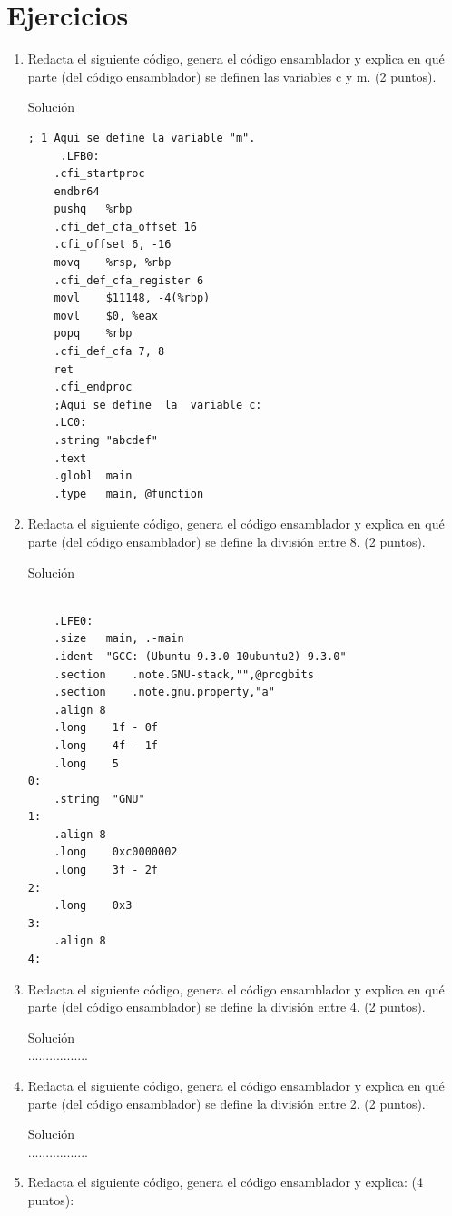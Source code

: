 \documentclass{article}
\begin{document}
	\section{Ejercicios}\label{sec:ejercicios}
	\begin{enumerate}
		\item Redacta el siguiente código, genera el código ensamblador y explica en qué parte (del código
ensamblador) se definen las variables c y m. (2 puntos).

            
		
		Solución \\
		
        
\begin{lstlisting}[language={[x86masm]Assembler}, basicstyle=\small]    
; 1 Aqui se define la variable "m".
     .LFB0:
	.cfi_startproc
	endbr64
	pushq	%rbp
	.cfi_def_cfa_offset 16
	.cfi_offset 6, -16
	movq	%rsp, %rbp
	.cfi_def_cfa_register 6
	movl	$11148, -4(%rbp)
	movl	$0, %eax
	popq	%rbp
	.cfi_def_cfa 7, 8
	ret
	.cfi_endproc
	;Aqui se define  la  variable c:
	.LC0:
	.string	"abcdef"
	.text
	.globl	main
	.type	main, @function
 \end{lstlisting}	
	
		
		\item Redacta el siguiente código, genera el código ensamblador y explica en qué parte (del código
ensamblador) se define la división entre 8. (2 puntos).

Solución \\
\begin{lstlisting}[language={[x86masm]Assembler}, basicstyle=\small]	
	
	.LFE0:
	.size	main, .-main
	.ident	"GCC: (Ubuntu 9.3.0-10ubuntu2) 9.3.0"
	.section	.note.GNU-stack,"",@progbits
	.section	.note.gnu.property,"a"
	.align 8
	.long	 1f - 0f
	.long	 4f - 1f
	.long	 5
0:
	.string	 "GNU"
1:
	.align 8
	.long	 0xc0000002
	.long	 3f - 2f
2:
	.long	 0x3
3:
	.align 8
4:
 \end{lstlisting}
		\item Redacta el siguiente código, genera el código ensamblador y explica en qué parte (del código
ensamblador) se define la división entre 4. (2 puntos).

		Solución \\
		.................
		\item  Redacta el siguiente código, genera el código ensamblador y explica en qué parte (del código
ensamblador) se define la división entre 2. (2 puntos).
       
       Solución \\
		.................
		\item  Redacta el siguiente código, genera el código ensamblador y explica: (4 puntos):
		

\end{enumerate}
\end{document}
